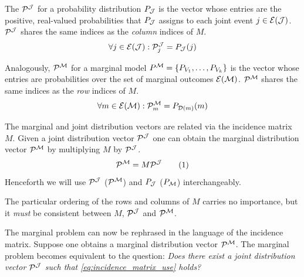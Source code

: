 \documentclass[aps, 10pt, english, twoside, pra, nofootinbib, longbibliography]{revtex4-1}
\begin{document}
    \begin{definition}
        The  $\probvec^{\jointvar}$ for a probability distribution $\prob[\jointvar]$ is the vector whose entries are the positive, real-valued probabilities that $\prob[\jointvar]$ assigns to each joint event $j \in \Events{\jointvar}$. $\probvec^{\jointvar}$ shares the same indices as the \textit{column} indices of $M$.
        \[ \forall j \in \Events{\jointvar} : \probvec^{\jointvar}_j = \prob[\jointvar][j] \]
    \end{definition}
    \begin{definition}
        Analogously,  $\probvec^{\mscenario}$ for a marginal model $\prob^{\mscenario} = \bc{P_{V_1}, \ldots, P_{V_k}}$ is the vector whose entries are probabilities over the set of marginal outcomes $\Events{\mscenario}$. $\probvec^{\mscenario}$ shares the same indices as the \textit{row} indices of $M$.
        \[ \forall m \in \Events{\mscenario} : \probvec^{\mscenario}_m = \prob[\Dom{m}][m] \]
    \end{definition}
    The marginal and joint distribution vectors are related via the incidence matrix $M$. Given a joint distribution vector $\probvec^{\jointvar}$ one can obtain the marginal distribution vector $\probvec^{\mscenario}$ by multiplying $M$ by $\probvec^{\jointvar}$.
    \[ \probvec^{\mscenario} = M \tcdot \probvec^{\jointvar} \eq \label{eq:incidence_matrix_use} \]
    Henceforth we will use $\probvec^{\jointvar}$ ($\probvec^{\mscenario}$) and $\prob[\jointvar]$ ($\prob_{\mscenario}$) interchangeably.

    \begin{remark}
        The particular ordering of the rows and columns of $M$ carries no importance, but it \textit{must} be consistent between $M$, $\probvec^{\jointvar}$ and $\probvec^{\mscenario}$.
    \end{remark}

    The marginal problem can now be rephrased in the language of the incidence matrix. Suppose one obtains a marginal distribution vector $\probvec^{\mscenario}$. The marginal problem becomes equivalent to the question: \textit{Does there exist a joint distribution vector $\probvec^{\jointvar}$ such that \cref{eq:incidence_matrix_use} holds?}
\end{document}
